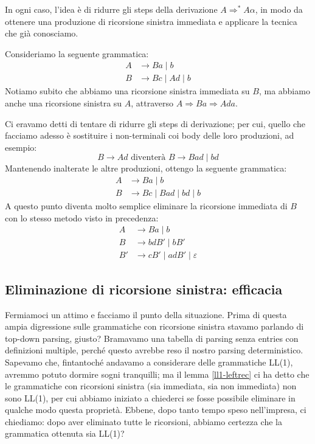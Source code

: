 \documentclass[class=book, crop=false, oneside, 12pt]{standalone}
\begin{document}
In ogni caso, l'idea è di ridurre gli steps della derivazione \(A \Rightarrow^* A \alpha\), in modo da ottenere una produzione di ricorsione sinistra immediata e applicare la tecnica che già conosciamo.

Consideriamo la seguente grammatica:
\begin{align*}
    A &\to Ba \mid b \\
    B &\to Bc \mid Ad \mid b
\end{align*}
Notiamo subito che abbiamo una ricorsione sinistra immediata su \(B\),  ma abbiamo anche una ricorsione sinistra su \(A\), attraverso \(A \Rightarrow Ba \Rightarrow Ada\).

Ci eravamo detti di tentare di ridurre gli steps di derivazione; per cui, quello che facciamo adesso è sostituire i non-terminali coi body delle loro produzioni, ad esempio:
\begin{equation*}
    B \to Ad \textrm{ diventerà } B \to Bad \mid bd
\end{equation*}
Mantenendo inalterate le altre produzioni, ottengo la seguente grammatica:
\begin{align*}
    A &\to Ba \mid b \\
    B &\to Bc \mid Bad \mid bd \mid b
\end{align*}
A questo punto diventa molto semplice eliminare la ricorsione immediata di \(B\) con lo stesso metodo visto in precedenza:
\begin{align*}
    A &\to Ba \mid b \\
    B &\to bdB' \mid bB' \\
    B' &\to cB' \mid adB' \mid \varepsilon
\end{align*}

\subsection{Eliminazione di ricorsione sinistra: efficacia}
Fermiamoci un attimo e facciamo il punto della situazione. Prima di questa ampia digressione sulle grammatiche con ricorsione sinistra stavamo parlando di top-down parsing, giusto? Bramavamo una tabella di parsing senza entries con definizioni multiple, perché questo avrebbe reso il nostro parsing deterministico. Sapevamo che, fintantoché andavamo a considerare delle grammatiche LL(1), avremmo potuto dormire sogni tranquilli; ma il lemma \ref{ll1-leftrec} ci ha detto che le grammatiche con ricorsioni sinistra (sia immediata, sia non immediata) non sono LL(1), per cui abbiamo iniziato a chiederci se fosse possibile eliminare in qualche modo questa proprietà. Ebbene, dopo tanto tempo speso nell'impresa, ci chiediamo: dopo aver eliminato tutte le ricorsioni, abbiamo certezza che la grammatica ottenuta sia LL(1)?
\end{document}
